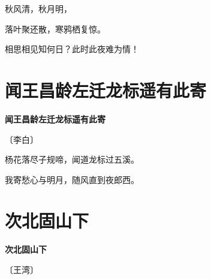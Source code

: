 \documentclass[12pt,UTF-8,openany,fontset=none]{ctexbook}
\begin{document}
\begin{center}
    \begin{Large}

        秋风清，秋月明，

        落叶聚还散，寒鸦栖复惊。

        相思相见知何日？此时此夜难为情！

    \end{Large}

\end{center}

\vspace{8pt}
\clearpage

\section{闻王昌龄左迁龙标遥有此寄}


\begin{center}
    {\bfseries 闻王昌龄左迁龙标遥有此寄}

    \vspace{18pt}

    \begin{large}\xuwen
        〔李白〕
    \end{large}

\end{center}

    \vspace{18pt}  %

\begin{center}
    \begin{Large}

        杨花落尽子规啼，闻道龙标过五溪。

        我寄愁心与明月，随风直到夜郎西。

    \end{Large}

\end{center}

\vspace{8pt}
\clearpage

\section{次北固山下}


\begin{center}
    {\bfseries 次北固山下}

    \vspace{18pt}

    \begin{large}\xuwen
        〔王湾〕
    \end{large}

\end{center}
\end{document}
